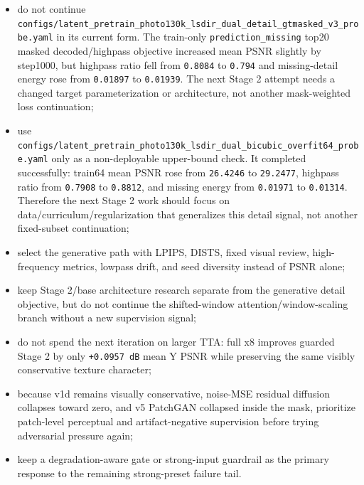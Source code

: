 \documentclass[
  10pt,
]{article}
\begin{document}
\begin{itemize}
  decoder capacity;
\item
  do not continue
  \texttt{configs/latent\_pretrain\_photo130k\_lsdir\_dual\_detail\_gtmasked\_v3\_probe.yaml}
  in its current form. The train-only \texttt{prediction\_missing} top20
  masked decoded/highpass objective increased mean PSNR slightly by
  step1000, but highpass ratio fell from \texttt{0.8084} to
  \texttt{0.794} and missing-detail energy rose from \texttt{0.01897} to
  \texttt{0.01939}. The next Stage 2 attempt needs a changed target
  parameterization or architecture, not another mask-weighted loss
  continuation;
\item
  use
  \texttt{configs/latent\_pretrain\_photo130k\_lsdir\_dual\_bicubic\_overfit64\_probe.yaml}
  only as a non-deployable upper-bound check. It completed successfully:
  train64 mean PSNR rose from \texttt{26.4246} to \texttt{29.2477},
  highpass ratio from \texttt{0.7908} to \texttt{0.8812}, and missing
  energy from \texttt{0.01971} to \texttt{0.01314}. Therefore the next
  Stage 2 work should focus on data/curriculum/regularization that
  generalizes this detail signal, not another fixed-subset continuation;
\item
  select the generative path with LPIPS, DISTS, fixed visual review,
  high-frequency metrics, lowpass drift, and seed diversity instead of
  PSNR alone;
\item
  keep Stage 2/base architecture research separate from the generative
  detail objective, but do not continue the shifted-window
  attention/window-scaling branch without a new supervision signal;
\item
  do not spend the next iteration on larger TTA: full x8 improves
  guarded Stage 2 by only \texttt{+0.0957\ dB} mean Y PSNR while
  preserving the same visibly conservative texture character;
\item
  because v1d remains visually conservative, noise-MSE residual
  diffusion collapses toward zero, and v5 PatchGAN collapsed inside the
  mask, prioritize patch-level perceptual and artifact-negative
  supervision before trying adversarial pressure again;
\item
  keep a degradation-aware gate or strong-input guardrail as the primary
  response to the remaining strong-preset failure tail.
\end{itemize}
\end{document}

